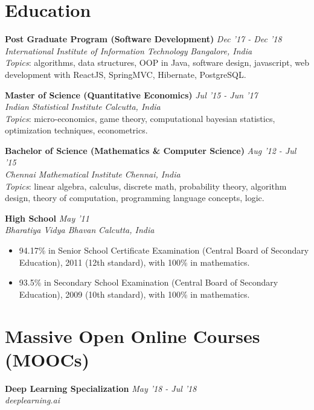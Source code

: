 \documentclass[margin]{res}
\begin{document}
\begin{resume}
\section{Education}


{\bf Post Graduate Program (Software Development)} \hfill \textit{Dec '17 - Dec '18}\\
\textit{International Institute of Information Technology} \hfill \textit{Bangalore, India}\\
{
    \small
    \emph{Topics}: algorithms, data structures, OOP in Java, software design, javascript, web development with ReactJS, SpringMVC, Hibernate, PostgreSQL.
}


{\bf Master of Science (Quantitative Economics)} \hfill \textit{Jul '15 - Jun '17}\\
\textit{Indian Statistical Institute} \hfill \textit{Calcutta, India}\\
{
    \small
    \emph{Topics}: micro-economics, game theory, computational bayesian statistics, optimization techniques, econometrics.
}


{\bf Bachelor of Science (Mathematics \& Computer Science)} \hfill \textit{Aug '12 - Jul '15} \\
\textit{Chennai Mathematical Institute} \hfill  \textit{Chennai, India}\\
{
    \small
    \emph{Topics}: linear algebra, calculus, discrete math, probability theory, algorithm design, theory of computation, programming language concepts, logic.
}

{\bf High School} \hfill  \textit{May '11} \\
\textit{Bharatiya Vidya Bhavan} \hfill \textit{Calcutta, India}\\
{\small
    \begin{itemize} \itemsep -2pt %
    \item 94.17\% in Senior School Certificate Examination (Central Board of Secondary Education), 2011 (12th standard), with 100\% in mathematics. \\
    \item 93.5\% in Secondary School Examination (Central Board of Secondary Education), 2009 (10th standard), with 100\% in mathematics. \\
    \end{itemize}
}



\section{Massive Open Online Courses (MOOCs)}
{\bf Deep Learning Specialization} \hfill \textit{May '18 - Jul '18}\\
\textit{deeplearning.ai}\\\\





\end{resume}
\end{document}
